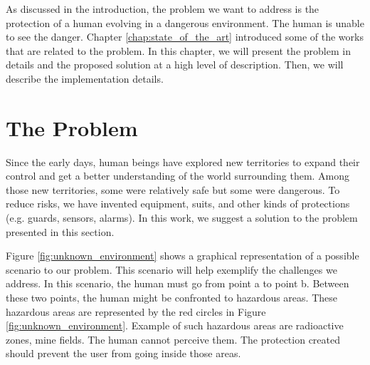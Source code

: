 \documentclass[oneside, a4paper, 12pt]{memoir}
\begin{document}

As discussed in the introduction, the problem we want to address is the protection of a human evolving in a dangerous environment. The human is unable to see the danger. Chapter \ref{chap:state_of_the_art} introduced some of the works that are related to the problem. In this chapter, we will present the problem in details and the proposed solution at a high level of description. Then, we will describe the implementation details.

	\section{The Problem}
		\label{sec:the_problem}

	
	Since the early days, human beings have explored new territories to expand their control and get a better understanding of the world surrounding them. Among those new territories, some were relatively safe but some were dangerous. To reduce risks, we have invented equipment, suits, and other kinds of protections (e.g. guards, sensors, alarms). In this work, we suggest a solution to the problem presented in this section.
	
	Figure \ref{fig:unknown_environment} shows a graphical representation of a possible scenario to our problem. This scenario will help exemplify the challenges we address. In this scenario, the human must go from point a to point b. Between these two points, the human might be confronted to hazardous areas. These hazardous areas are represented by the red circles in Figure \ref{fig:unknown_environment}. Example of such hazardous areas are radioactive zones, mine fields. The human cannot perceive them. The protection created should prevent the user from going inside those areas.
	
\end{document}
